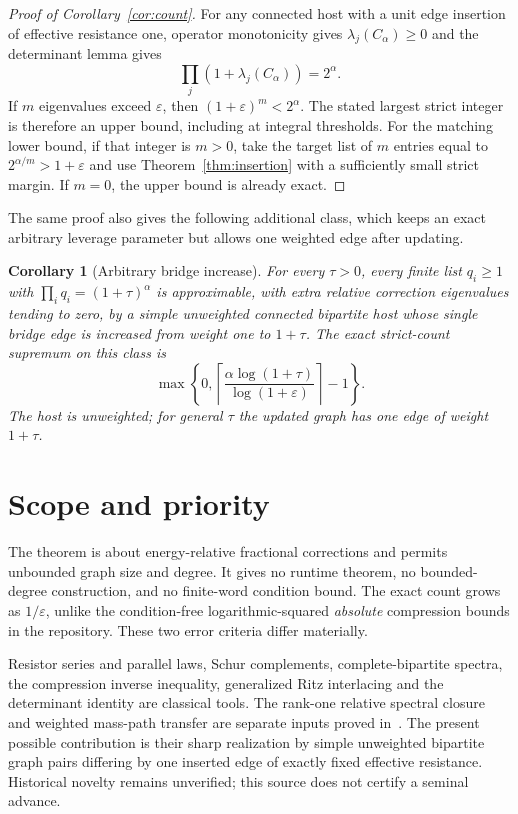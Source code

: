 \documentclass[11pt]{article}
\newtheorem{corollary}[theorem]{Corollary}
\begin{document}
\begin{proof}[Proof of Corollary~\ref{cor:count}]
For any connected host with a unit edge insertion of effective
resistance one, operator monotonicity gives $\lambda_j(C_\alpha)\ge0$
and the determinant lemma gives
\[
 \prod_j(1+\lambda_j(C_\alpha))=2^\alpha.
\]
If $m$ eigenvalues exceed $\varepsilon$, then
$(1+\varepsilon)^m<2^\alpha$. The stated largest strict integer is
therefore an upper bound, including at integral thresholds.
For the matching lower bound, if that integer is $m>0$, take the
target list of $m$ entries equal to $2^{\alpha/m}>1+\varepsilon$
and use Theorem~\ref{thm:insertion} with a sufficiently small strict
margin. If $m=0$, the upper bound is already exact.
\end{proof}

The same proof also gives the following additional class, which keeps
an exact arbitrary leverage parameter but allows one weighted edge
after updating.
\begin{corollary}[Arbitrary bridge increase]\label{cor:bridge}
For every $\tau>0$, every finite list $q_i\ge1$ with
$\prod_iq_i=(1+\tau)^\alpha$ is approximable, with extra relative
correction eigenvalues tending to zero, by a simple unweighted
connected bipartite host whose single bridge edge is increased from
weight one to $1+\tau$.
The exact strict-count supremum on this class is
\[
 \max\left\{0,\left\lceil
    \frac{\alpha\log(1+\tau)}{\log(1+\varepsilon)}
                           \right\rceil-1\right\}.
\]
The host is unweighted; for general $\tau$ the updated graph has one
edge of weight $1+\tau$.
\end{corollary}

\section{Scope and priority}
The theorem is about energy-relative fractional corrections and permits
unbounded graph size and degree. It gives no runtime theorem, no
bounded-degree construction, and no finite-word condition bound.
The exact count grows as $1/\varepsilon$, unlike the condition-free
logarithmic-squared \emph{absolute} compression bounds in the
repository. These two error criteria differ materially.

Resistor series and parallel laws, Schur complements, complete-bipartite
spectra, the compression inverse inequality, generalized Ritz
interlacing and the determinant identity are classical tools. The
rank-one relative spectral closure and weighted mass-path transfer
are separate inputs proved in~\cite{Relative}.
The present possible contribution is their sharp realization by
simple unweighted bipartite graph pairs differing by one inserted
edge of exactly fixed effective resistance. Historical novelty
remains unverified; this source does not certify a seminal advance.
\end{document}
